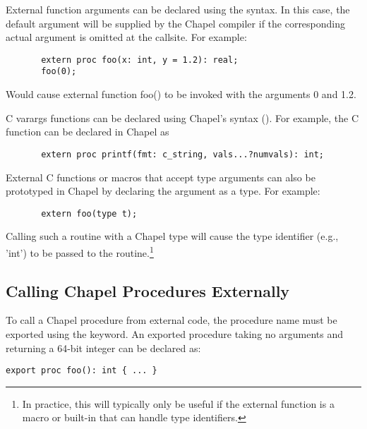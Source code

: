 External function arguments can be declared using the 
syntax.  In this case, the default argument will be supplied by the Chapel
compiler if the corresponding actual argument is omitted at the callsite.  For example:
\begin{chapel}
\begin{verbatim}
       extern proc foo(x: int, y = 1.2): real;
       foo(0);
\end{verbatim}
\end{chapel}
Would cause external function foo() to be invoked with the arguments 0
and 1.2.

C varargs functions can be declared using
Chapel's  syntax ().  For example,
the C  function can be declared in Chapel as
\begin{chapel}
\begin{verbatim}
       extern proc printf(fmt: c_string, vals...?numvals): int;
\end{verbatim}
\end{chapel}

External C functions or macros that accept type arguments can also be
prototyped in Chapel by declaring the argument as a type.  For
example:
\begin{chapel}
\begin{verbatim}
       extern foo(type t);
\end{verbatim}
\end{chapel}
Calling such a routine with a Chapel type will cause the type
identifier (e.g., 'int') to be passed to the routine.\footnote{In practice,
this will typically only be useful if the external function is a macro
or built-in that can handle type identifiers.}

\subsection{Calling Chapel Procedures Externally}
\label{Calling_Chapel_Procedures_Externally}

To call a Chapel procedure from external code, the procedure name must be
exported using the  keyword.  An exported procedure taking no
arguments and returning a 64-bit integer can be declared as:
\begin{chapel}
\begin{verbatim}
export proc foo(): int { ... }
\end{verbatim}
\end{chapel}

